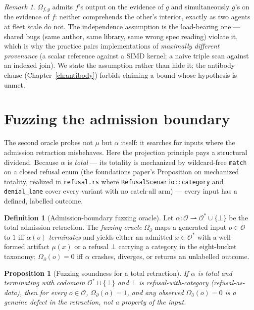 \documentclass[11pt,oneside]{book}
\theoremstyle{definition}
\newtheorem{definition}{Definition}[chapter]
\theoremstyle{plain}
\newtheorem{proposition}[theorem]{Proposition}
\theoremstyle{remark}
\newtheorem*{remark}{Remark}
\newcommand{\Obs}{\mathcal{O}}                 %
\newcommand{\Adm}{\mathcal{O}^{*}}             %
\newcommand{\muop}{\mu}                        %
\newcommand{\adm}{\alpha}                      %
\newcommand{\Rfsl}{\bot}                        %
\newcommand{\code}[1]{\texttt{#1}}
\begin{document}
\begin{remark}
$\Omega_{f,g}$ admits $f$'s output on the evidence of $g$ and simultaneously $g$'s on the evidence of $f$: neither comprehends the other's interior, exactly as two agents at fleet scale do not. %
The independence assumption is the load-bearing one --- shared bugs (same author, same library, same wrong spec reading) violate it, which is why the practice pairs implementations of \emph{maximally different provenance} (a scalar reference against a SIMD kernel; a naive triple scan against an indexed join). %
We state the assumption rather than hide it; the antibody clause (Chapter~\ref{ch:antibody}) forbids claiming a bound whose hypothesis is unmet. %
\end{remark}

\section{Fuzzing the admission boundary}
The second oracle probes not $\muop$ but $\adm$ itself: it searches for inputs where the admission retraction misbehaves. %
Here the projection principle pays a structural dividend. %
Because $\adm$ is \emph{total} --- its totality is mechanized by wildcard-free \code{match} on a closed refusal enum (the foundations paper's Proposition on mechanized totality, realized in \code{refusal.rs} where \code{RefusalScenario::category} and \code{denial\_lane} cover every variant with no catch-all arm) --- every input has a defined, labelled outcome. %

\begin{definition}[Admission-boundary fuzzing oracle]\label{def:fuzz}
Let $\adm:\Obs\rightharpoonup\Adm\cup\{\Rfsl\}$ be the total admission retraction. %
The \emph{fuzzing oracle} $\Omega_\partial$ maps a generated input $o\in\Obs$ to $1$ iff $\adm(o)$ \emph{terminates} and yields either an admitted $x\in\Adm$ with a well-formed artifact $\muop(x)$ or a refusal $\Rfsl$ carrying a category in the eight-bucket taxonomy; $\Omega_\partial(o)=0$ iff $\adm$ crashes, diverges, or returns an unlabelled outcome. %
\end{definition}

\begin{proposition}[Fuzzing soundness for a total retraction]\label{prop:fuzz}
If $\adm$ is total and terminating with codomain $\Adm\cup\{\Rfsl\}$ and $\Rfsl$ is refusal-with-category (refusal-as-data), then for every $o\in\Obs$, $\Omega_\partial(o)=1$, and any observed $\Omega_\partial(o)=0$ is a genuine defect in the retraction, not a property of the input. %
\end{proposition}
\end{document}
